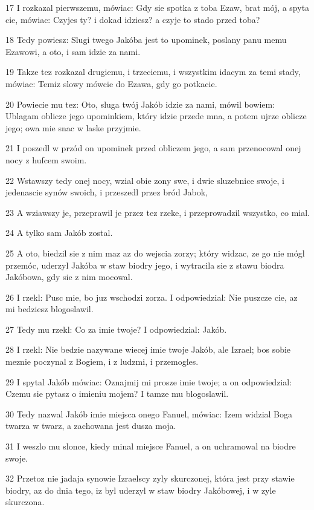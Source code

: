 \par 17 I rozkazal pierwszemu, mówiac: Gdy sie spotka z toba Ezaw, brat mój, a spyta cie, mówiac: Czyjes ty? i dokad idziesz? a czyje to stado przed toba?
\par 18 Tedy powiesz: Slugi twego Jakóba jest to upominek, poslany panu memu Ezawowi, a oto, i sam idzie za nami.
\par 19 Takze tez rozkazal drugiemu, i trzeciemu, i wszystkim idacym za temi stady, mówiac: Temiz slowy mówcie do Ezawa, gdy go potkacie.
\par 20 Powiecie mu tez: Oto, sluga twój Jakób idzie za nami, mówil bowiem: Ublagam oblicze jego upominkiem, który idzie przede mna, a potem ujrze oblicze jego; owa mie snac w laske przyjmie.
\par 21 I poszedl w przód on upominek przed obliczem jego, a sam przenocowal onej nocy z hufcem swoim.
\par 22 Wstawszy tedy onej nocy, wzial obie zony swe, i dwie sluzebnice swoje, i jedenascie synów swoich, i przeszedl przez bród Jabok,
\par 23 A wziawszy je, przeprawil je przez tez rzeke, i przeprowadzil wszystko, co mial.
\par 24 A tylko sam Jakób zostal.
\par 25 A oto, biedzil sie z nim maz az do wejscia zorzy; który widzac, ze go nie mógl przemóc, uderzyl Jakóba w staw biodry jego, i wytracila sie z stawu biodra Jakóbowa, gdy sie z nim mocowal.
\par 26 I rzekl: Pusc mie, bo juz wschodzi zorza. I odpowiedzial: Nie puszcze cie, az mi bedziesz blogoslawil.
\par 27 Tedy mu rzekl: Co za imie twoje? I odpowiedzial: Jakób.
\par 28 I rzekl: Nie bedzie nazywane wiecej imie twoje Jakób, ale Izrael; bos sobie meznie poczynal z Bogiem, i z ludzmi, i przemogles.
\par 29 I spytal Jakób mówiac: Oznajmij mi prosze imie twoje; a on odpowiedzial: Czemu sie pytasz o imieniu mojem? I tamze mu blogoslawil.
\par 30 Tedy nazwal Jakób imie miejsca onego Fanuel, mówiac: Izem widzial Boga twarza w twarz, a zachowana jest dusza moja.
\par 31 I weszlo mu slonce, kiedy minal miejsce Fanuel, a on uchramowal na biodre swoje.
\par 32 Przetoz nie jadaja synowie Izraelscy zyly skurczonej, która jest przy stawie biodry, az do dnia tego, iz byl uderzyl w staw biodry Jakóbowej, i w zyle skurczona.

